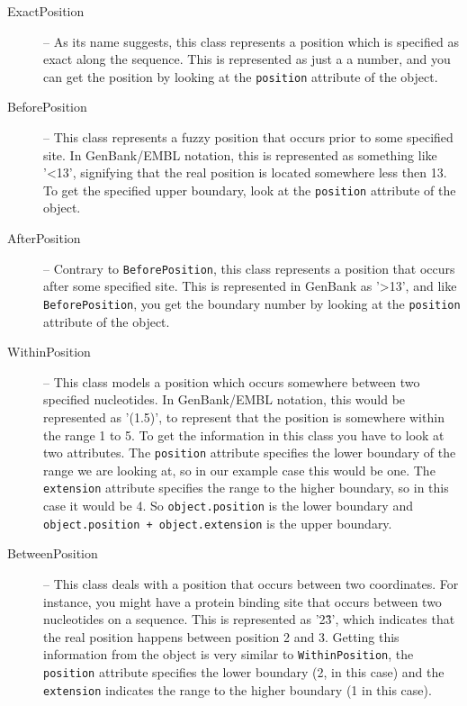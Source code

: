 \documentclass{report}
\begin{document}
\begin{description}
  \item[ExactPosition] -- As its name suggests, this class represents a position which is specified as exact along the sequence. This is represented as just a a number, and you can get the position by looking at the \verb|position| attribute of the object.

  \item[BeforePosition] -- This class represents a fuzzy position that occurs prior to some specified site. In GenBank/EMBL notation, this is represented as something like '<13', signifying that the real position is located somewhere less then 13. To get the specified upper boundary, look at the \verb|position| attribute of the object.

  \item[AfterPosition] -- Contrary to \verb|BeforePosition|, this class represents a position that occurs after some specified site. This is represented in GenBank as '>13', and like \verb|BeforePosition|, you get the boundary number by looking at the \verb|position| attribute of the object.

  \item[WithinPosition] -- This class models a position which occurs somewhere between two specified nucleotides. In GenBank/EMBL notation, this would be represented as '(1.5)', to represent that the position is somewhere within the range 1 to 5. To get the information in this class you have to look at two attributes. The \verb|position| attribute specifies the lower boundary of the range we are looking at, so in our example case this would be one. The \verb|extension| attribute specifies the range to the higher boundary, so in this case it would be 4. So \verb|object.position| is the lower boundary and \verb|object.position + object.extension| is the upper boundary.

  \item[BetweenPosition] -- This class deals with a position that occurs between two coordinates. For instance, you might have a protein binding site that occurs between two nucleotides on a sequence. This is represented as '2\^3', which indicates that the real position happens between position 2 and 3. Getting this information from the object is very similar to \verb|WithinPosition|, the \verb|position| attribute specifies the lower boundary (2, in this case) and the \verb|extension| indicates the range to the higher boundary (1 in this case).
\end{description}
\end{document}
